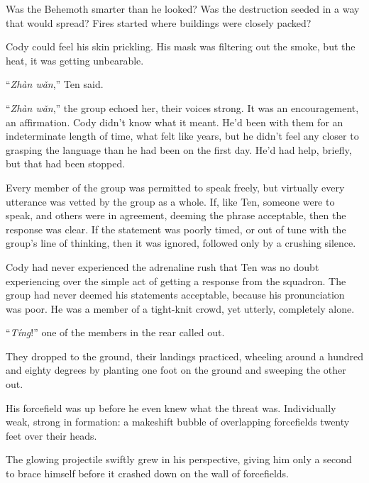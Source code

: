 Was the Behemoth smarter than he looked?  Was the destruction seeded in a way that would spread?  Fires started where buildings were closely packed?



Cody could feel his skin prickling.  His mask was filtering out the smoke, but the heat, it was getting unbearable.



``\emph{Zh\`{a}n w\v{a}n},'' Ten said.



``\emph{Zh\`{a}n w\v{a}n},'' the group echoed her, their voices strong.  It was an encouragement, an affirmation.  Cody didn't know what it meant.  He'd been with them for an indeterminate length of time, what felt like years, but he didn't feel any closer to grasping the language than he had been on the first day.  He'd had help, briefly, but that had been stopped.



Every member of the group was permitted to speak freely, but virtually every utterance was vetted by the group as a whole.  If, like Ten, someone were to speak, and others were in agreement, deeming the phrase acceptable, then the response was clear.  If the statement was poorly timed, or out of tune with the group's line of thinking, then it was ignored, followed only by a crushing silence.



Cody had never experienced the adrenaline rush that Ten was no doubt experiencing over the simple act of getting a response from the squadron.  The group had never deemed his statements acceptable, because his pronunciation was poor.  He was a member of a tight-knit crowd, yet utterly, completely alone.



``\emph{T\'{i}ng}!'' one of the members in the rear called out.



They dropped to the ground, their landings practiced, wheeling around a hundred and eighty degrees by planting one foot on the ground and sweeping the other out.



His forcefield was up before he even knew what the threat was.  Individually weak, strong in formation: a makeshift bubble of overlapping forcefields twenty feet over their heads.



The glowing projectile swiftly grew in his perspective, giving him only a second to brace himself before it crashed down on the wall of forcefields.



